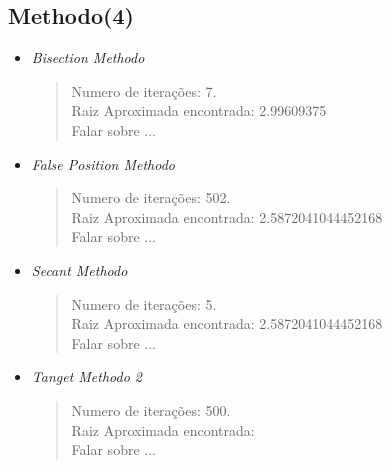 \documentclass[12pt]{article}
\begin{document}
\subsection{Methodo(4)}
\begin{itemize}
    \item \textit{Bisection Methodo}\\
        \begin{verse}
          Numero de iterações: 7.\\
          Raiz Aproximada encontrada: 2.99609375\\
          Falar sobre ...
        \end{verse}
    \item \textit{False Position Methodo}
        \begin{verse}
          Numero de iterações: 502.\\
          Raiz Aproximada encontrada: 2.5872041044452168\\
          Falar sobre ...
        \end{verse}
    \item \textit{Secant Methodo}
        \begin{verse}
          Numero de iterações: 5.\\
          Raiz Aproximada encontrada: 2.5872041044452168\\
          Falar sobre ...
        \end{verse}
    \item \textit{Tanget Methodo 2}
        \begin{verse}
          Numero de iterações: 500.\\
          Raiz Aproximada encontrada: \\
          Falar sobre ...
        \end{verse}
\end{itemize}
\end{document}
